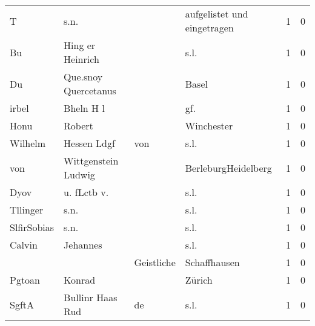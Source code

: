 \begin{center}
\begin{tiny}
\begin{longtabu}{llllrr}
                        T &                               s.n. &             &                 aufgelistet und eingetragen &          1 &         0 \\
                       Bu &                   Hing er Heinrich &             &                                        s.l. &          1 &         0 \\
                       Du &               Que.snoy Quercetanus &             &                                       Basel &          1 &         0 \\
                    irbel &                          Bheln H l &             &                                        gf.  &          1 &         0 \\
                     Honu &                             Robert &             &                                  Winchester &          1 &         0 \\
                  Wilhelm &                        Hessen Ldgf &         von &                                        s.l. &          1 &         0 \\
                      von &                Wittgenstein Ludwig &             &                         BerleburgHeidelberg &          1 &         0 \\
                     Dyov &                        u. fLctb v. &             &                                        s.l. &          1 &         0 \\
                 Tllinger &                               s.n. &             &                                        s.l. &          1 &         0 \\
              SlfirSobias &                               s.n. &             &                                        s.l. &          1 &         0 \\
                   Calvin &                           Jehannes &             &                                        s.l. &          1 &         0 \\
                          &                                    &  Geistliche &                                Schaffhausen &          1 &         0 \\
                   Pgtoan &                             Konrad &             &                                      Zürich &          1 &         0 \\
                    SgftA &                   Bullinr Haas Rud &          de &                                        s.l. &          1 &         0 \\

\end{longtabu}
\end{tiny}
\end{center}
